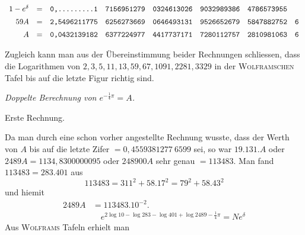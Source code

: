\[\begin{array}{rcrlllll}
1-e^\delta&=&\text{\ttfamily 0,.........1}&\text{\ttfamily 7156951279}&\text{\ttfamily 0324613026}&\text{\ttfamily 9032989386}&\text{\ttfamily 4786573955}&\\[5pt]
59A&=&\text{\ttfamily 2,5496211775}&\text{\ttfamily 6256273669}&\text{\ttfamily 0646493131}&\text{\ttfamily 9526652679}&\text{\ttfamily 5847882752}&\text{\ttfamily 6}\\[5pt]
A&=&\text{\ttfamily 0,0432139182}&\text{\ttfamily 6377224977}&\text{\ttfamily 4417737171}&\text{\ttfamily 7280112757}&\text{\ttfamily 2810981063}&\text{\ttfamily 6}
\end{array}
\]\endgroup


Zugleich kann man aus der Übereinstimmung beider Rechnungen schliessen,
dass die Logarithmen von $2,3,5,11,13,59,67,1091,2281,3329$ in der
\textsc{Wolframschen} Tafel bis auf die letzte Figur richtig sind.

\begin{center}\textit{Doppelte Berechnung von $e^{-\frac14\pi}=A$.}\end{center}
\begin{center}Erste Rechnung.\end{center}

Da man durch eine schon vorher angestellte Rechnung wusste, dass der
Werth von $A$ bis auf die letzte Zifer $=0,4559381277\ 6599$ sei, so war
$19.131.A$ oder $2489A=1134,8300000095$ oder $248900A$ sehr genau $=113483$.
Man fand $113483=283.401$ aus
\[
113483=311^2+58.17^2=79^2+58.43^2
\]
und hiemit
\[
\begin{aligned}2489A&=113483.10^{-2}.\\[7pt]&\quad{}e^{2\log10-\log283-\log401+\log2489-\frac14\pi}=Ne^\delta\end{aligned}
\]
Aus \textsc{Wolframs} Tafeln erhielt man

